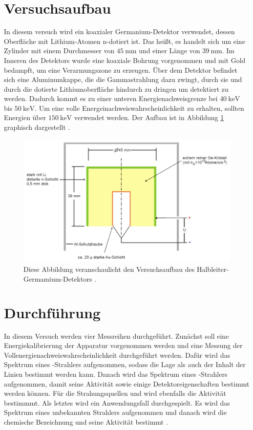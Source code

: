 \section{Versuchsaufbau}
In diesem versuch wird ein koaxialer Germanium-Detektor verwendet,
dessen Oberfläche mit Lithium-Atomen n-dotiert ist. Das heißt, es handelt 
sich um eine Zylinder mit einem Durchmesser von $\SI{45}{\milli\meter}$ und einer 
Länge von $\SI{39}{\milli\meter}$. 
Im Inneren des Detektors wurde eine koaxiale Bohrung vorgenommen und mit Gold 
bedampft, um eine Verarmungszone zu erzeugen. 
Über dem Detektor befindet sich eine Aluminumkappe, die die Gammastrahlung dazu zwingt, 
durch sie und durch die dotierte Lithiumoberfläche hindurch zu dringen um detektiert zu werden.
Dadurch kommt es zu einer unteren Energienachweisgrenze bei 
$\SI{40}{\kilo\electronvolt}$ bis $\SI{50}{\kilo\electronvolt}$.
Um eine volle Energeinachweiswahrscheinlichkeit zu erhalten, sollten  Energien über 
$\SI{150}{\kilo\electronvolt}$ verwendet werden. 
Der Aufbau ist in Abbildung \ref{abb1} graphisch dargestellt \cite{sample}.

\begin{figure}
    \centering
    \includegraphics[width=\textwidth]{figure/Aufbau.pdf}
    \caption{Diese Abbildung veranschaulicht den Versuchsaufbau des Halbleiter-Germamium-Detektors \cite{sample}.}
    \label{abb1}
\end{figure}



\section{Durchführung}
\label{sec:Durchführung}

In diesem Versuch werden vier Messreihen durchgeführt. 
Zunächst soll eine Energiekalibrierung der Apparatur vorgenommen werden und eine 
Messung der Vollenergienachweiswahrscheinlichkeit durchgeführt werden.
Dafür wird das Spektrum eines -Strahlers aufgenommen, sodass die Lage 
als auch der Inhalt der Linien bestimmt werden kann.
Danach wird das Spektrum eines -Strahlers aufgenommen, damit seine 
Aktivität sowie einige Detektoreigenschaften bestimmt werden können.
Für die Strahungsquellen  und  wird ebenfalls die Aktivität 
bestimmmt.
Als letztes wird ein Anwendungsfall durchgespielt. 
Es wird das Spektrum eines unbekannten Strahlers aufgenommen und danach wird die 
chemische Bezeichnung und seine Aktivität bestimmt \cite{sample}.
